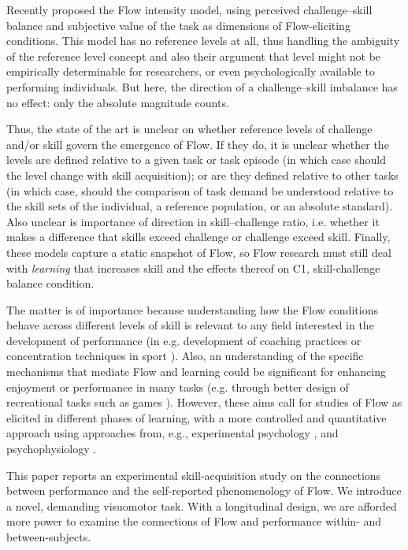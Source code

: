 \documentclass{frontierstyle/frontiersSCNS}
\begin{document}
Recently \citet[pp-56]{Keller2012} proposed the Flow intensity model, using perceived challenge--skill balance and subjective value of the task as dimensions of Flow-eliciting conditions. This model has no reference levels at all, thus handling the ambiguity of the reference level concept and also their argument that level might not be empirically determinable for researchers, or even psychologically available to performing individuals. But here, the direction of a challenge--skill imbalance has no effect: only the absolute magnitude counts.

Thus, the state of the art is unclear on whether reference levels of challenge and/or skill govern the emergence of Flow. If they do, it is unclear whether the levels are defined relative to a given task or task episode (in which case should the level change with skill acquisition); or are they defined relative to other tasks (in which case, should the comparison of task demand be understood relative to the skill sets of the individual, a reference population, or an absolute standard). Also unclear is importance of direction in skill--challenge ratio, i.e. whether it makes a difference that skills exceed challenge or challenge exceed skill. Finally, these models capture a static snapshot of Flow, so Flow research must still deal with \textit{learning} that increases skill and the effects thereof on {\sf C1}, skill-challenge balance condition.

The matter is of importance because understanding how the Flow conditions behave across different levels of skill is relevant to any field interested in the development of performance (in e.g. development of coaching practices or concentration techniques in sport \citep{Jackson1996}). Also, an understanding of the specific mechanisms that mediate Flow and learning could be significant for enhancing enjoyment or performance in many tasks (e.g. through better design of recreational tasks such as games \citep{Chen2007}). However, these aims call for studies of Flow as elicited in different phases of learning, with a more controlled and quantitative approach using approaches from, e.g., experimental psychology \citep{Harris2017,Keller2008}, and psychophysiology \citep{Peifer2012,Peifer2014,Wolf2015,Harmat2015,Labonte-LeMoyne2016}.

This paper reports an experimental skill-acquisition study on the connections between performance and the self-reported phenomenology of Flow. We introduce a novel, demanding visuomotor task. With a longitudinal design, we are afforded more power to examine the connections of Flow and performance within- and between-subjects.
\end{document}
